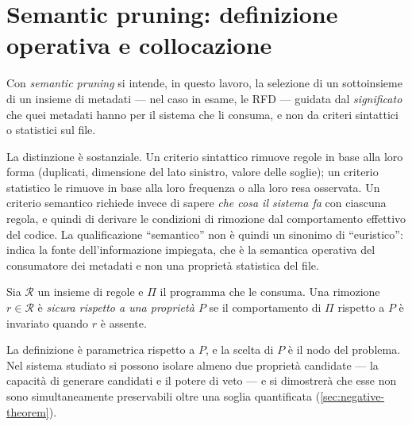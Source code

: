 \section{Semantic pruning: definizione operativa e collocazione}\label{sec:semantic-pruning}

Con \emph{semantic pruning} si intende, in questo lavoro, la selezione di un sottoinsieme di un
insieme di metadati --- nel caso in esame, le RFD --- guidata dal \emph{significato} che quei
metadati hanno per il sistema che li consuma, e non da criteri sintattici o statistici sul file.

La distinzione è sostanziale. Un criterio sintattico rimuove regole in base alla loro forma
(duplicati, dimensione del lato sinistro, valore delle soglie); un criterio statistico le rimuove
in base alla loro frequenza o alla loro resa osservata. Un criterio semantico richiede invece di
sapere \emph{che cosa il sistema fa} con ciascuna regola, e quindi di derivare le condizioni di
rimozione dal comportamento effettivo del codice. La qualificazione ``semantico'' non è quindi un
sinonimo di ``euristico'': indica la fonte dell'informazione impiegata, che è la semantica
operativa del consumatore dei metadati e non una proprietà statistica del file.

\begin{definition}\label{def:safe-pruning}
Sia $\mathcal{R}$ un insieme di regole e $\Pi$ il programma che le consuma. Una rimozione
$r \in \mathcal{R}$ è \emph{sicura rispetto a una proprietà $P$} se il comportamento di $\Pi$
rispetto a $P$ è invariato quando $r$ è assente.
\end{definition}

La definizione è parametrica rispetto a $P$, e la scelta di $P$ è il nodo del problema. Nel
sistema studiato si possono isolare almeno due proprietà candidate --- la capacità di generare
candidati e il potere di veto --- e si dimostrerà che esse non sono simultaneamente preservabili
oltre una soglia quantificata (\autoref{sec:negative-theorem}).

